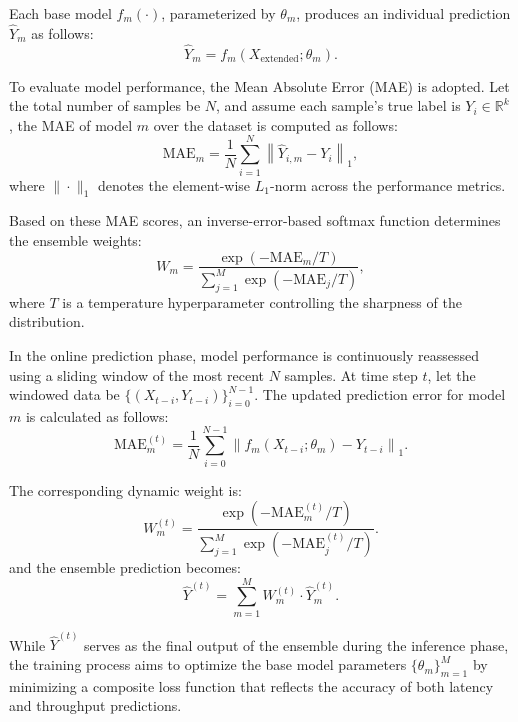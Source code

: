 \documentclass[a4paper,fleqn]{cas-dc}
\begin{document}
Each base model \(f_m(\cdot)\), parameterized by \(\theta_m\), produces an individual prediction \(\hat{Y}_m\) as follows:
\begin{equation}
	\hat{Y}_m = f_m(X_{\text{extended}}; \theta_m).
\end{equation}

To evaluate model performance, the Mean Absolute Error (MAE) is adopted. Let the total number of samples be \(N\), and assume each sample's true label is \(Y_i \in \mathbb{R}^k\), the MAE of model \(m\) over the dataset is computed as follows:
\begin{equation}
	\text{MAE}_m = \frac{1}{N} \sum_{i=1}^{N} \left\| \hat{Y}_{i,m} - Y_i \right\|_1,
\end{equation}
where \(\|\cdot\|_1\) denotes the element-wise \(L_1\)-norm across the performance metrics.

Based on these MAE scores, an inverse-error-based softmax function determines the ensemble weights:
\begin{equation}
	W_m = \frac{\exp(-\text{MAE}_m / T)}{\sum_{j=1}^{M} \exp(-\text{MAE}_j / T)},
\end{equation}
where \(T\) is a temperature hyperparameter controlling the sharpness of the distribution.

In the online prediction phase, model performance is continuously reassessed using a sliding window of the most recent \(N\) samples. At time step \(t\), let the windowed data be \(\{(X_{t-i}, Y_{t-i})\}_{i=0}^{N-1}\). The updated prediction error for model \(m\) is calculated as follows:
\begin{equation}
	\text{MAE}_m^{(t)} = \frac{1}{N} \sum_{i=0}^{N-1} \left\| f_m(X_{t-i}; \theta_m) - Y_{t-i} \right\|_1.
\end{equation}

The corresponding dynamic weight is:
\begin{equation}
	W_m^{(t)} = \frac{\exp(-\text{MAE}_m^{(t)} / T)}{\sum_{j=1}^{M} \exp(-\text{MAE}_j^{(t)} / T)}.
\end{equation}
and the ensemble prediction becomes:
\begin{equation}
	\hat{Y}^{(t)} = \sum_{m=1}^{M} W_m^{(t)} \cdot \hat{Y}_m^{(t)}.
\end{equation}

While \(\hat{Y}^{(t)}\) serves as the final output of the ensemble during the inference phase, the training process aims to optimize the base model parameters \(\{\theta_m\}_{m=1}^{M}\) by minimizing a composite loss function that  reflects the accuracy of both latency and throughput predictions.
\end{document}
